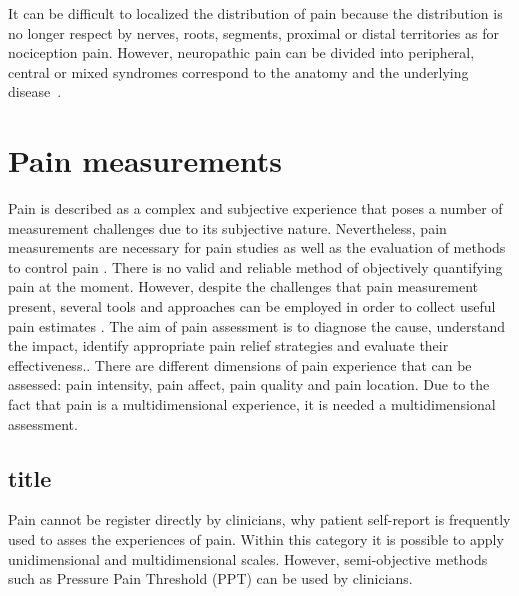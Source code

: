 It can be difficult to localized the distribution of pain because the distribution is no longer respect by nerves, roots, segments, proximal or distal territories as for nociception pain. However, neuropathic pain can be divided into peripheral, central or mixed syndromes correspond to the anatomy and the underlying disease~\cite{Mindruta2013}. 


\section{Pain measurements}
Pain is described as a complex and subjective experience that poses a number of measurement challenges due to its subjective nature. Nevertheless, pain measurements are necessary for pain studies as well as the evaluation of methods to control pain \cite{libro pain}.
There is no valid and reliable method of objectively quantifying pain at the moment. However, despite the challenges that pain measurement present, several tools and approaches can be employed in order to collect useful pain estimates \cite{pain outcomes paper}. The aim of pain assessment is to diagnose the cause, understand the impact, identify appropriate pain relief strategies and evaluate their effectiveness.\cite{art and science}. There are different dimensions of pain experience that can be assessed: pain intensity, pain affect, pain quality and pain location. Due to the fact that pain is a multidimensional experience, it is needed a multidimensional assessment.
\subsection{title}
Pain cannot be register directly by clinicians, why patient self-report is frequently used to asses the experiences of pain\cite{libro pain}. Within this category it is possible to apply unidimensional and multidimensional scales. However, semi-objective methods such as Pressure Pain Threshold (PPT) can be used by clinicians. 

